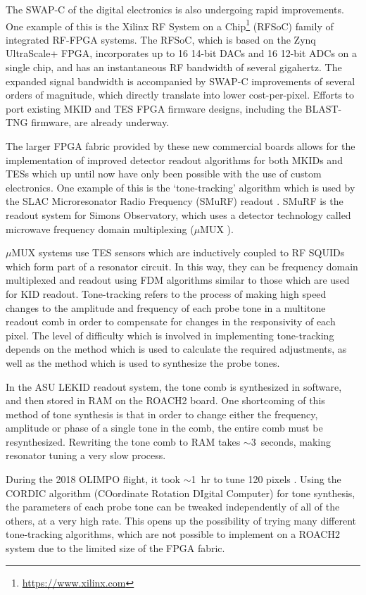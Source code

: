 The SWAP-C of the digital electronics is also undergoing rapid improvements. One example of this is the Xilinx RF System on a Chip\footnote{\url{https://www.xilinx.com}} (RFSoC) family of integrated RF-FPGA systems. The RFSoC, which is based on the Zynq UltraScale+ FPGA, incorporates up to 16 14-bit DACs and 16 12-bit ADCs on a single chip, and has an instantaneous RF bandwidth of several gigahertz. The expanded signal bandwidth is accompanied by SWAP-C improvements of several orders of magnitude, which directly translate into lower cost-per-pixel. Efforts to port existing MKID and TES FPGA firmware designs, including the BLAST-TNG firmware, are already underway.

The larger FPGA fabric provided by these new commercial boards allows for the implementation of improved detector readout algorithms for both MKIDs and TESs which up until now have only been possible with the use of custom electronics. One example of this is the `tone-tracking' algorithm which is used by the SLAC Microresonator Radio Frequency (SMuRF) readout \citep{henderson2018highly}. SMuRF is the readout system for Simons Observatory, which uses a detector technology called microwave frequency domain multiplexing ($\mu$MUX \cite{irwin2004microwave}).

$\mu$MUX systems use TES sensors which are inductively coupled to RF SQUIDs which form part of a resonator circuit. In this way, they can be frequency domain multiplexed and readout using FDM algorithms similar to those which are used for KID readout. Tone-tracking refers to the process of making high speed changes to the amplitude and frequency of each probe tone in a multitone readout comb in order to compensate for changes in the responsivity of each pixel. The level of difficulty which is involved in implementing tone-tracking depends on the method which is used to calculate the required adjustments, as well as the method which is used to synthesize the probe tones.

In the ASU LEKID readout system, the tone comb is synthesized in software, and then stored in RAM on the ROACH2 board. One shortcoming of this method of tone synthesis is that in order to change either the frequency, amplitude or phase of a single tone in the comb, the entire comb must be resynthesized. Rewriting the tone comb to RAM takes $\sim$3~seconds, making resonator tuning a very slow process.

During the 2018 OLIMPO flight, it took $\sim$1~hr to tune 120 pixels \citep{masi2019kinetic}. Using the CORDIC algorithm (COordinate Rotation DIgital Computer) for tone synthesis, the parameters of each probe tone can be tweaked independently of all of the others, at a very high rate. This opens up the possibility of trying many different tone-tracking algorithms, which are not possible to implement on a ROACH2 system due to the limited size of the FPGA fabric.

